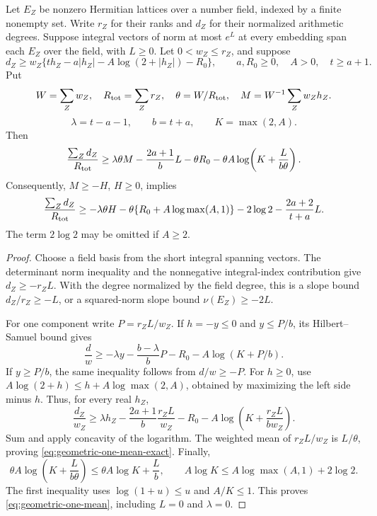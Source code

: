 \begin{proposition}
\label{geometric-one-mean}
Let $E_Z$ be nonzero Hermitian lattices over a number field, indexed by
a finite nonempty set. Write $r_Z$ for their ranks and $d_Z$ for their
normalized arithmetic degrees. Suppose integral vectors of norm at most
$e^L$ at every embedding span each $E_Z$ over the field, with $L\ge0$.
Let $0<w_Z\le r_Z$, and suppose
\[
 d_Z\ge w_Z\{t h_Z-a|h_Z|-A\log(2+|h_Z|)-R_0\},
 \qquad a,R_0\ge0,\quad A>0,\quad t\ge a+1.
\]
Put
\[
 W=\sum_Zw_Z,\quad R_{\rm tot}=\sum_Zr_Z,\quad
 \theta=W/R_{\rm tot},\quad M=W^{-1}\sum_Zw_Zh_Z.
\]
\[
 \lambda=t-a-1,\qquad b=t+a,\qquad K=\max(2,A).
\]
Then
\begin{equation}\label{eq:geometric-one-mean-exact}
 \frac{\sum_Zd_Z}{R_{\rm tot}}
 \ge\lambda\theta M-\frac{2a+1}{b}L-\theta R_0
       -\theta A\log\!\left(K+\frac{L}{b\theta}\right).
\end{equation}
Consequently, $M\ge-H$, $H\ge0$, implies
\begin{equation}\label{eq:geometric-one-mean}
 \frac{\sum_Zd_Z}{R_{\rm tot}}
 \ge-\lambda\theta H-\theta\{R_0+A\log\max(A,1)\}
       -2\log2-\frac{2a+2}{t+a}L.
\end{equation}
The term $2\log2$ may be omitted if $A\ge2$.
\end{proposition}
\begin{proof}
Choose a field basis from the short integral spanning vectors.
The determinant norm inequality and the nonnegative integral-index
contribution give $d_Z\ge-r_ZL$. With the degree normalized by the
field degree, this is a slope bound $d_Z/r_Z\ge-L$, or a
squared-norm slope bound $\nu(E_Z)\ge-2L$.

For one component write $P=r_ZL/w_Z$. If $h=-y\le0$ and
$y\le P/b$, its Hilbert--Samuel bound gives
\[
 \frac d w\ge-\lambda y-\frac{b-\lambda}{b}P
                    -R_0-A\log(K+P/b).
\]
If $y\ge P/b$, the same inequality follows from $d/w\ge-P$.
For $h\ge0$, use
$A\log(2+h)\le h+A\log\max(2,A)$, obtained by maximizing the
left side minus $h$. Thus, for every real $h_Z$,
\[
 \frac{d_Z}{w_Z}\ge
 \lambda h_Z-\frac{2a+1}{b}\frac{r_ZL}{w_Z}
 -R_0-A\log\!\left(K+\frac{r_ZL}{bw_Z}\right).
\]
Sum and apply concavity of the logarithm. The weighted mean of
$r_ZL/w_Z$ is $L/\theta$, proving
\eqref{eq:geometric-one-mean-exact}. Finally,
\[
 \theta A\log\!\left(K+\frac{L}{b\theta}\right)
 \le\theta A\log K+\frac Lb,
 \qquad
 A\log K\le A\log\max(A,1)+2\log2.
\]
The first inequality uses $\log(1+u)\le u$ and $A/K\le1$.
This proves \eqref{eq:geometric-one-mean}, including $L=0$
and $\lambda=0$.
\end{proof}

